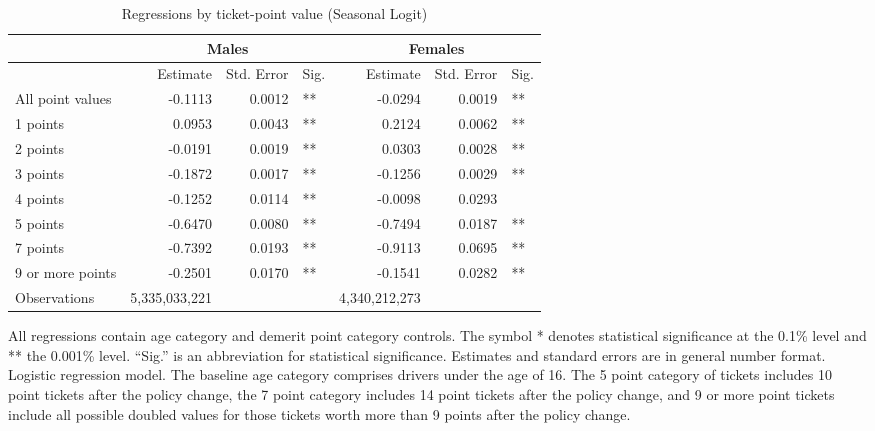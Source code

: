 
\begin{table}%
\centering 
\begin{tabular}{l r r l r r l} 

\hline 
 
 & \multicolumn{3}{c}{Males} & \multicolumn{3}{c}{Females} \\ 

\hline 
 
 & Estimate & Std. Error & Sig. & Estimate & Std. Error & Sig. \\ 

\hline 
 
All point values                &  -0.1113        &  0.0012       &   **       &  -0.0294        &  0.0019       &   **       \\ 
1 points                        &  0.0953        &  0.0043       &   **       &  0.2124        &  0.0062       &   **       \\ 
2 points                        &  -0.0191        &  0.0019       &   **       &  0.0303        &  0.0028       &   **       \\ 
3 points                        &  -0.1872        &  0.0017       &   **       &  -0.1256        &  0.0029       &   **       \\ 
4 points                        &  -0.1252        &  0.0114       &   **       &  -0.0098        &  0.0293       &            \\ 
5 points                        &  -0.6470        &  0.0080       &   **       &  -0.7494        &  0.0187       &   **       \\ 
7 points                        &  -0.7392        &  0.0193       &   **       &  -0.9113        &  0.0695       &   **       \\ 
9 or more points                &  -0.2501        &  0.0170       &   **       &  -0.1541        &  0.0282       &   **       \\ 
Observations            & 5,335,033,221    &          &              &  4,340,212,273 \\ 


\hline 

\end{tabular} 
\caption{Regressions by ticket-point value (Seasonal Logit)} 
All regressions contain age category and demerit point category controls. 
The symbol * denotes statistical significance at the 0.1\% level 
and ** the 0.001\% level. 
``Sig.'' is an abbreviation for statistical significance. 
Estimates and standard errors are in general number format. 
Logistic regression model. 
The baseline age category comprises drivers under the age of 16. 
The 5 point category of tickets includes 10 point tickets after the policy change,  
the 7 point category includes 14 point tickets after the policy change,  
and 9 or more point tickets include all possible doubled values for those tickets  
worth more than 9 points after the policy change. 
\label{tab:seas_logit_regs_by_points} 
\end{table} 
 

